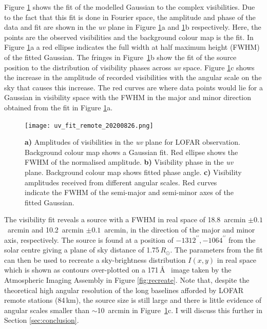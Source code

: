 Figure \ref{fig:uv_fit} shows the fit of the modelled Gaussian to the complex visibilities. Due to the fact that this fit is done in Fourier space, the amplitude and phase of the data and fit are shown in the \textit{uv} plane in Figure \ref{fig:uv_fit}a and \ref{fig:uv_fit}b respectively. Here, the points are the observed visibilities and the background colour map is the fit. In Figure \ref{fig:uv_fit}a a red ellipse indicates the full width at half maximum height (FWHM) of the fitted Gaussian. The fringes in Figure~\ref{fig:uv_fit}b show the fit of the source position to the distribution of visibility phases across \textit{uv} space.
Figure \ref{fig:uv_fit}c shows the increase in the amplitude of recorded visibilities with the angular scale on the sky that causes this increase. The red curves are where data points would lie for a Gaussian in visibility space with the FWHM in the major and minor direction obtained from the fit in Figure \ref{fig:uv_fit}a.

\begin{figure}
    \centering
    \texttt{[image: uv\_fit\_remote\_20200826.png]}
    \caption[Results of directly fitting LOFAR visibilities.]{\textbf{a)} Amplitudes of visibilities in the \textit{uv} plane for LOFAR observation. Background colour map shows a Gaussian fit. Red ellipse shows the FWHM of the normalised amplitude. \textbf{b)} Visibility phase in the \textit{uv} plane. Background colour map shows fitted phase angle. \textbf{c)} Visibility amplitudes received from different angular scales. Red curves indicate the FWHM of the semi-major and semi-minor axes of the fitted Gaussian.}
    \label{fig:uv_fit}
\end{figure}

The visibility fit reveals a source with a FWHM in real space of 18.8~arcmin $\pm 0.1$~arcmin and 10.2~arcmin $\pm 0.1$~arcmin, in the direction of the major and minor axis, respectively. The source is found at a position of $-1312^{\prime\prime}, -1064^{\prime\prime}$ from the solar centre giving a plane of sky distance of 1.75$\, R_\odot$. The parameters from the fit can then be used to recreate a sky-brightness distribution $I(x,y)$ in real space which is shown as contours over-plotted on a 171\,\AA~ image taken by the Atmospheric Imaging Assembly \citep[AIA;][]{Lemen2012} in Figure \ref{fig:recreate}. Note that, despite the theoretical high angular resolution of the long baselines afforded by LOFAR remote stations (84\,km), the source size is still large and there is little evidence of angular scales smaller than $\sim$10~arcmin in Figure~\ref{fig:uv_fit}c. I will discuss this further in Section \ref{sec:conclusion}.

